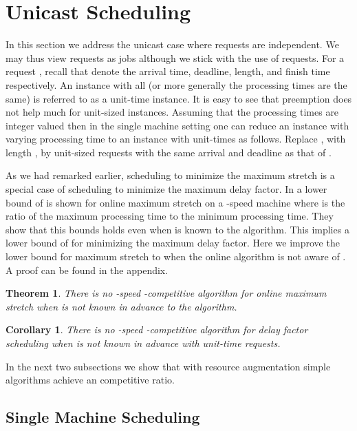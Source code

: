 \documentclass[11pt]{article}
\newtheorem{theorem}[lemma]{Theorem}
\newtheorem{corollary}[lemma]{Corollary}
\begin{document}
\section{Unicast Scheduling}
\label{sec:unicast}
In this section we address the unicast case where requests are
independent. We may thus view requests as jobs although we stick with
the use of requests. For a request , recall that
 denote the arrival time, deadline, length, and
finish time respectively. An instance with all  (or more
generally the processing times are the same) is referred to as a
unit-time instance. It is easy to see that preemption does not help
much for unit-sized instances. Assuming that the processing times are
integer valued then in the single machine setting one can reduce an
instance with varying processing time to an instance with unit-times
as follows. Replace , with length , by 
unit-sized requests with the same arrival and deadline as that of
.

As we had remarked earlier, scheduling to minimize the maximum stretch
is a special case of scheduling to minimize the maximum delay factor.
In \cite{BenderCM98} a lower bound of  is shown for online
maximum stretch on a -speed machine where  is the ratio of the
maximum processing time to the minimum processing time. They show that
this bounds holds even when  is known to the algorithm.  This
implies a lower bound of  for minimizing the maximum delay
factor. Here we improve the lower bound for maximum stretch to
 when the online algorithm is not aware of . A proof
can be found in the appendix.

\begin{theorem}
  \label{thm:unicast_lb}
  There is no -speed -competitive algorithm
  for online maximum stretch when  is not known in advance to
  the algorithm.
\end{theorem}

\begin{corollary}
\label{delayonlylower}
There is no -speed -competitive algorithm
for delay factor scheduling when  is not known in advance with unit-time requests.
\end{corollary}

In the next two subsections we show that with  resource
augmentation simple algorithms achieve an  competitive
ratio.

\subsection{Single Machine Scheduling}
\label{unicast-single}
\end{document}
